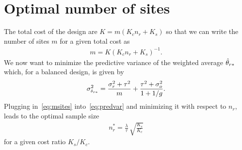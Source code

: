 \documentclass[a4paper, 11pt]{article}
\begin{document}
\section{Optimal number of sites}

The total cost of the design are $K = m(K_{c}n_{r} + K_{s})$ so that we can
write the number of sites $m$ for a given total cost as
\begin{align}
  \label{eq:msites}
  m = K (K_{c}n_{r} + K_{s})^{-1}.
\end{align}
We now want to minimize the predictive variance of the weighted average
$\hat{\theta}_{r*}$ which, for a balanced design, is given by
\begin{align}
  \label{eq:predvar}
  \sigma^{2}_{\scriptscriptstyle \hat{\theta}_{r*}}
  = \frac{\sigma^{2}_{r} + \tau^{2}}{m} + \frac{\tau^{2} + \sigma^{2}_{o}}{1 + 1/g}.
\end{align}
Plugging in~\eqref{eq:msites} into~\eqref{eq:predvar} and minimizing it with
respect to $n_{r}$, leads to the optimal sample size
\begin{align*}
  n_{r}^{*}
  = \frac{\lambda}{\tau} \, \sqrt{\frac{K_{s}}{K_{c}}}
\end{align*}
for a given cost ratio $K_{s}/K_{c}$.




\end{document}
